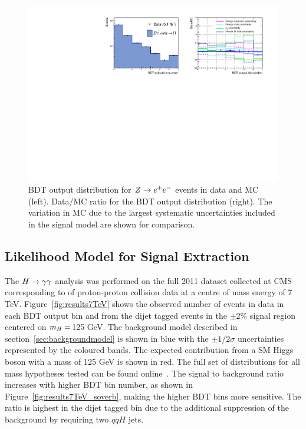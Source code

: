 \begin{figure}
\begin{center}
  \includegraphics[width=\textwidth]{hgg7TeV/zeeValidation/zeebdtoutput.pdf}
\end{center}
 \caption{BDT output distribution for $Z\rightarrow e^{+}e^{-}$ events in data and MC (left).
Data/MC ratio for the BDT output distribution (right). The variation in MC due to 
the largest systematic uncertainties included in the signal model are shown for comparison.}
 \label{fig:zeebdtoutput}
\end{figure}

\subsection{Likelihood Model for Signal Extraction}
\label{sec:statisticalinterpretations}

The $H\rightarrow\gamma\gamma$ analysis was performed on the full 2011 dataset collected at CMS
corresponding to \clumi of proton-proton collision data at a centre of mass energy of 7 TeV.
Figure~\ref{fig:results7TeV} shows the observed number of events in data in each BDT output bin and from the
dijet tagged events in the $\pm 2\%$ signal region centered on $m_{H}=$125 GeV. The background model described in 
section~\ref{sec:backgroundmodel} is shown in blue with the $\pm1/2\sigma$ uncertainties represented by the coloured bands.
The expected contribution from a SM Higgs boson with a mass of 125 GeV is shown in red. 
The full set of distributions for all mass hypotheses tested can be found online~\citep{onlineresults}.
The signal to background ratio increases with higher BDT bin number, as shown in Figure~\ref{fig:results7TeV_soverb}, 
making the higher BDT bins more sensitive.
The ratio is highest in the dijet tagged bin due to the additional suppression of the background by requiring two 
$qqH$ jets.

